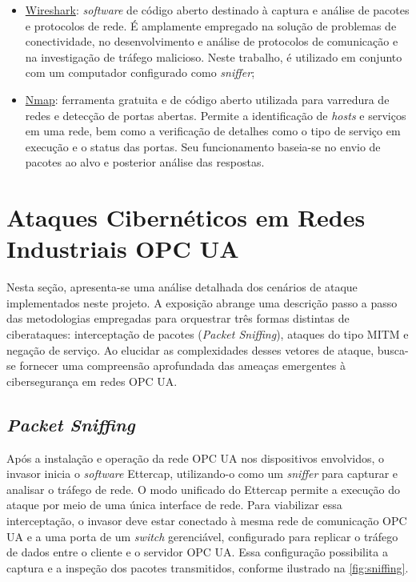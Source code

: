 \begin{itemize}
            \item \underline{Wireshark}: \textit{software} de código aberto destinado à captura e análise de pacotes e protocolos de rede. É amplamente empregado na solução de problemas de conectividade, no desenvolvimento e análise de protocolos de comunicação e na investigação de tráfego malicioso. Neste trabalho, é utilizado em conjunto com um computador configurado como \textit{sniffer};
            \item \underline{Nmap}: ferramenta gratuita e de código aberto utilizada para varredura de redes e detecção de portas abertas. Permite a identificação de \textit{hosts} e serviços em uma rede, bem como a verificação de detalhes como o tipo de serviço em execução e o status das portas. Seu funcionamento baseia-se no envio de pacotes ao alvo e posterior análise das respostas.
        \end{itemize}

\section{Ataques Cibernéticos em Redes Industriais OPC UA} \label{sec:attacks}

    Nesta seção, apresenta-se uma análise detalhada dos cenários de ataque implementados neste projeto. A exposição abrange uma descrição passo a passo das metodologias empregadas para orquestrar três formas distintas de ciberataques: interceptação de pacotes (\textit{Packet Sniffing}), ataques do tipo MITM e negação de serviço. Ao elucidar as complexidades desses vetores de ataque, busca-se fornecer uma compreensão aprofundada das ameaças emergentes à cibersegurança em redes OPC UA.

    \subsection{\textit{Packet Sniffing}}

        Após a instalação e operação da rede OPC UA nos dispositivos envolvidos, o invasor inicia o \textit{software} Ettercap, utilizando-o como um \textit{sniffer} para capturar e analisar o tráfego de rede. O modo unificado do Ettercap permite a execução do ataque por meio de uma única interface de rede. Para viabilizar essa interceptação, o invasor deve estar conectado à mesma rede de comunicação OPC UA e a uma porta de um \textit{switch} gerenciável, configurado para replicar o tráfego de dados entre o cliente e o servidor OPC UA. Essa configuração possibilita a captura e a inspeção dos pacotes transmitidos, conforme ilustrado na \autoref{fig:sniffing}.

